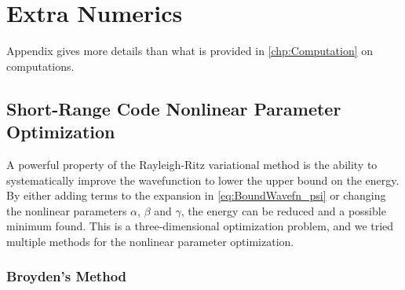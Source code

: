 \documentclass[Dissertation.tex]{subfiles}
\begin{document}
\chapter{Extra Numerics}
\label{chp:ExtraNumerics}

\iftoggle{UNT}{This}{\lettrine{\textcolor{startcolor}{T}}{his}}
Appendix gives more
details than what is provided in \cref{chp:Computation} on
computations.

\section{Short-Range Code Nonlinear Parameter Optimization}
\label{sec:BoundOptimization}

A powerful property of the Rayleigh-Ritz variational method is the 
ability to systematically improve the wavefunction to lower the upper bound 
on the energy. By either adding terms to the expansion in
\cref{eq:BoundWavefn_psi} or changing the nonlinear parameters $\alpha$,
$\beta$ and $\gamma$, the energy can be reduced and a possible minimum
found. This is a three-dimensional optimization problem, and we tried 
multiple methods for the nonlinear parameter optimization.


\subsection{Broyden's Method}
\label{sec:Broyden}

\end{document}
